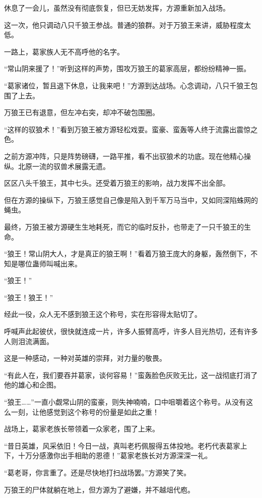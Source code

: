 \begin{this_body}
休息了一会儿，虽然没有彻底恢复，但已无妨发挥，方源重新加入战场。

这一次，他只调动八只千狼王参战。普通的狼群。对于万狼王来讲，威胁程度太低。

一路上，葛家族人无不高呼他的名字。

“常山阴来援了！”听到这样的声势，围攻万狼王的葛家高层，都纷纷精神一振。

“葛家诸位，暂且退下休息，让我来吧！”方源到达战场。心念调动，八只千狼王包围了上去。

万狼王已有退意，但左冲右突，却冲不破包围圈。

“这样的驭狼术！”看到万狼王被方源轻松戏耍。蛮豪、蛮轰等人终于流露出震惊之色。

之前方源冲阵，只是阵势磅礴，一路平推，看不出驭狼术的功底。现在他精心操纵。北原一流的驭兽术展露无遗。

区区八头千狼王，其中七头。还受着万狼王的影响，战力发挥不出全部。

但在方源的操纵下，万狼王感觉自己像是陷入到千军万马当中，又如同深陷蛛网的蝇虫。

最终，万狼王被方源硬生生地耗死，而它的临时反扑，也带走了一只千狼王的生命。

“狼王！常山阴大人，才是真正的狼王啊！”看着万狼王庞大的身躯，轰然倒下，不知是哪位蛊师叫喊出来。

“狼王！”

“狼王！狼王！”

经此一役，众人无不感到狼王这个称号，实在形容得太贴切了。

呼喊声此起彼伏，很快就连成一片，许多人振臂高呼，许多人目光热切，还有许多人则泪流满面。

这是一种感动，一种对英雄的崇拜，对力量的敬畏。

“有此人在，我们要吞并葛家，谈何容易！”蛮轰脸色灰败无比，这一战彻底打消了他的雄心和企图。

“狼王……”一直小觑常山阴的蛮豪，则失神喃喃，口中咀嚼着这个称号。从没有这么一刻，让他感觉到这个称号的份量是如此之重！

战场上，葛家老族长带领着一众家老，围了上来。

“昔日英雄，风采依旧！今日一战，真叫老朽佩服得五体投地。老朽代表葛家上下，十万分感激你出手相助的恩德！”葛家老族长对方源深深一礼。

“葛老哥，你言重了。还是尽快地打扫战场罢。”方源笑了笑。

万狼王的尸体就躺在地上，但方源为了避嫌，并不越俎代庖。


\end{this_body}
